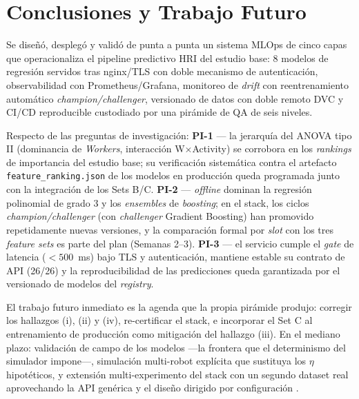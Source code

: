 \documentclass[conference]{IEEEtran}
\begin{document}
\section{Conclusiones y Trabajo Futuro}

Se diseñó, desplegó y validó de punta a punta un sistema MLOps de cinco capas que operacionaliza el pipeline predictivo HRI del estudio base: 8 modelos de regresión servidos tras nginx/TLS con doble mecanismo de autenticación, observabilidad con Prometheus/Grafana, monitoreo de \textit{drift} con reentrenamiento automático \textit{champion/challenger}, versionado de datos con doble remoto DVC y CI/CD reproducible custodiado por una pirámide de QA de seis niveles.

Respecto de las preguntas de investigación: \textbf{PI-1} — la jerarquía del ANOVA tipo II (dominancia de \textit{Workers}, interacción W$\times$Activity) se corrobora en los \textit{rankings} de importancia del estudio base; su verificación sistemática contra el artefacto \texttt{feature\_ranking.json} de los modelos en producción queda programada junto con la integración de los Sets B/C. \textbf{PI-2} — \textit{offline} dominan la regresión polinomial de grado 3 y los \textit{ensembles} de \textit{boosting}; en el stack, los ciclos \textit{champion/challenger} (con \textit{challenger} Gradient Boosting) han promovido repetidamente nuevas versiones, y la comparación formal por \textit{slot} con los tres \textit{feature sets} es parte del plan (Semanas 2--3). \textbf{PI-3} — el servicio cumple el \textit{gate} de latencia ($<500$~ms) bajo TLS y autenticación, mantiene estable su contrato de API (26/26) y la reproducibilidad de las predicciones queda garantizada por el versionado de modelos del \textit{registry}.

El trabajo futuro inmediato es la agenda que la propia pirámide produjo: corregir los hallazgos (i), (ii) y (iv), re-certificar el stack, e incorporar el Set C al entrenamiento de producción como mitigación del hallazgo (iii). En el mediano plazo: validación de campo de los modelos —la frontera que el determinismo del simulador impone—, simulación multi-robot explícita que sustituya los $\eta$ hipotéticos, y extensión multi-experimento del stack con un segundo dataset real aprovechando la API genérica y el diseño dirigido por configuración \cite{garcia2026}.
\end{document}
